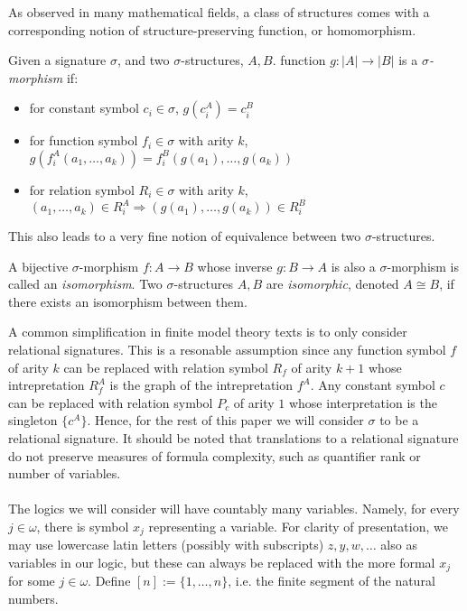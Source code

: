 As observed in many mathematical fields, a class of structures comes with a corresponding notion of structure-preserving function, or homomorphism. 
\begin{defn}
Given a signature $\sigma$, and two $\sigma$-structures, $A,B$. function $g:|A| \longrightarrow |B|$ is a \textit{$\sigma$-morphism} if: 
\begin{itemize}
    \item for constant symbol $c_{i} \in \sigma$, $g(c_{i}^{A}) = c_{i}^{B}$
    \item for function symbol $f_{i} \in \sigma$ with arity $k$, $g(f_{i}^{A}(a_{1},\dots,a_{k})) = f_{i}^{B}(g(a_{1}),\dots,g(a_{k}))$
    \item for relation symbol $R_{i} \in \sigma$ with arity $k$, $(a_{1},\dots,a_{k}) \in R_{i}^{A} \Rightarrow (g(a_{1}),\dots,g(a_{k})) \in R_{i}^{B}$
\end{itemize}
\end{defn}
This also leads to a very fine notion of equivalence between two $\sigma$-structures. 
\begin{defn}
A bijective $\sigma$-morphism $f:A \longrightarrow B$ whose inverse $g:B \longrightarrow A$ is also a $\sigma$-morphism is called an \textit{isomorphism}. Two $\sigma$-structures $A,B$ are \textit{isomorphic}, denoted $A \cong B$, if there exists an isomorphism between them. 
\end{defn}
A common simplification in finite model theory texts is to only consider relational signatures. This is a resonable assumption since any function symbol $f$ of arity $k$ can be replaced with relation symbol $R_{f}$ of arity $k+1$ whose intrepretation $R^{A}_{f}$ is the graph of the intrepretation $f^{A}$. Any constant symbol $c$ can be replaced with relation symbol $P_{c}$ of arity $1$ whose interpretation is the singleton $\{c^{A}\}$. Hence, for the rest of this paper we will consider $\sigma$ to be a relational signature.  It should be noted that translations to a relational signature do not preserve measures of formula complexity, such as quantifier rank or number of variables. \\~\\
 The logics we will consider will have countably many variables. Namely, for every $j \in \omega$, there is symbol $x_{j}$ representing a variable. For clarity of presentation, we may use lowercase latin letters (possibly with subscripts) $z,y,w,\dots$ also as variables in our logic, but these can always be replaced with the more formal $x_{j}$ for some $j \in \omega$. Define $[n] := \{1,\dots,n\}$, i.e. the finite segment of the natural numbers.   
